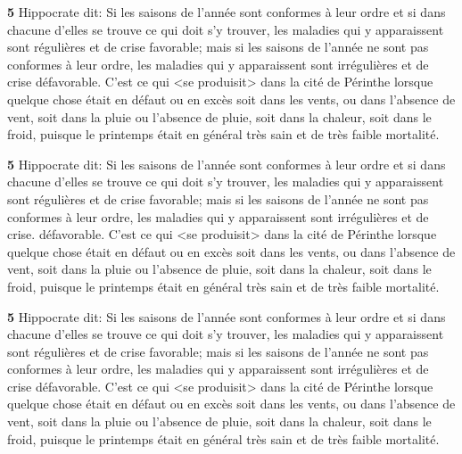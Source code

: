 \documentclass[12pt,a4paper]{memoir}
\begin{document}
\begin{pages}
\begin{Leftside}
\pstart\vspace{2.1\baselineskip}
\textbf{5}
Hippocrate dit: Si les saisons de l'année sont conformes à leur ordre
et si dans chacune d'elles se trouve ce qui doit s'y trouver, les
maladies qui y apparaissent sont régulières et de crise favorable;
mais si les saisons de l'année ne sont pas conformes à leur ordre, les
maladies qui y apparaissent sont irrégulières et de crise
défavorable. C'est ce qui <se produisit> dans la cité de Périnthe
lorsque quelque chose était en défaut ou en excès soit dans les vents,
ou dans l'absence de vent, soit dans la pluie ou l'absence de pluie,
soit dans la chaleur, soit dans le froid, puisque le printemps était
en général très sain et de très faible mortalité.
\pend

\pstart\vspace{2.1\baselineskip}
\textbf{5}
Hippocrate dit: Si les saisons de l'année sont conformes à leur ordre
et si dans chacune d'elles se trouve ce qui doit s'y trouver, les
maladies qui y apparaissent sont régulières et de crise favorable;
mais si les saisons de l'année ne sont pas conformes à leur ordre, les
maladies qui y apparaissent sont irrégulières et de crise.
défavorable. C'est ce qui <se produisit> dans la cité de Périnthe
lorsque quelque chose était en défaut ou en excès soit dans les vents,
ou dans l'absence de vent, soit dans la pluie ou l'absence de pluie,
soit dans la chaleur, soit dans le froid, puisque le printemps était
en général très sain et de très faible mortalité.
\pend

\pstart\vspace{2.1\baselineskip}
\textbf{5}
Hippocrate dit: Si les saisons de l'année sont conformes à leur ordre
et si dans chacune d'elles se trouve ce qui doit s'y trouver, les
maladies qui y apparaissent sont régulières et de crise favorable;
mais si les saisons de l'année ne sont pas conformes à leur ordre, les
maladies qui y apparaissent sont irrégulières et de crise
défavorable. C'est ce qui <se produisit> dans la cité de Périnthe
lorsque quelque chose était en défaut ou en excès soit dans les vents,
ou dans l'absence de vent, soit dans la pluie ou l'absence de pluie,
soit dans la chaleur, soit dans le froid, puisque le printemps était
en général très sain et de très faible mortalité.
\pend



\endnumbering

\end{Leftside}


\end{pages}
\end{document}

